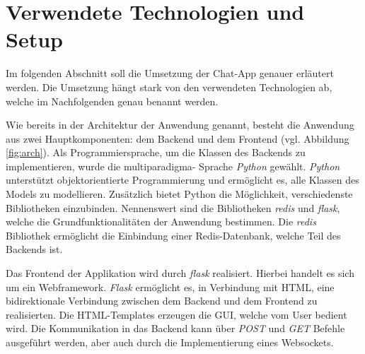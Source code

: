 
\section{Verwendete Technologien und Setup}
Im folgenden Abschnitt soll die Umsetzung der Chat-App genauer erläutert werden.
Die Umsetzung hängt stark von den verwendeten Technologien ab, welche im Nachfolgenden genau benannt werden.

Wie bereits in der Architektur der Anwendung genannt, besteht die Anwendung aus zwei Hauptkomponenten: dem Backend und dem Frontend (vgl. Abbildung \ref{fig:arch}).
Als Programmiersprache, um die Klassen des Backends zu implementieren, wurde die multiparadigma- Sprache \textit{Python} gewählt.
\textit{Python} unterstützt objektorientierte Programmierung und ermöglicht es, alle Klassen des Models zu modellieren. 
Zusätzlich bietet Python die Möglichkeit, verschiedenste Bibliotheken einzubinden.
Nennenswert sind die Bibliotheken \textit{redis} und \textit{flask}, welche die Grundfunktionalitäten der Anwendung bestimmen. 
Die \textit{redis} Bibliothek ermöglicht die Einbindung einer \acs{Redis}-Datenbank, welche Teil des Backends ist.

Das Frontend der Applikation wird durch \textit{flask} realisiert. Hierbei handelt es sich um ein Webframework.
\textit{Flask} ermöglicht es, in Verbindung mit \ac{HTML}, eine bidirektionale Verbindung zwischen dem Backend und dem Frontend zu realisierten.
Die \acs{HTML}-Templates erzeugen die \acs{GUI}, welche vom User bedient wird. Die Kommunikation in das Backend kann über \textit{POST} und \textit{GET}  Befehle ausgeführt werden, aber auch durch die Implementierung eines Websockets.


